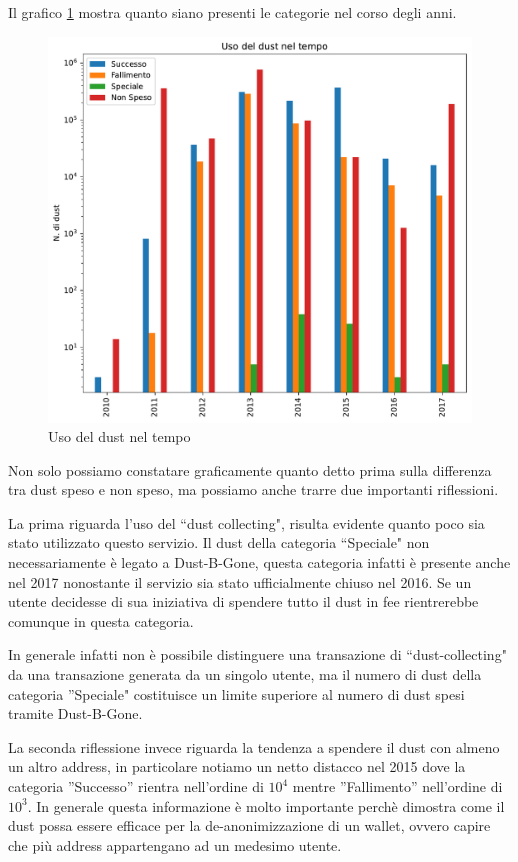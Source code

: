 Il grafico \ref{fig:dust_year} mostra quanto siano presenti le categorie nel corso degli anni.
\begin{figure}[h!]
    \centering
    \includegraphics[scale=0.6]{Grafici/uso_del_dust_new.pdf}
    \caption{Uso del dust nel tempo}
    \label{fig:dust_year}
\end{figure}
\FloatBarrier
Non solo possiamo constatare graficamente quanto detto prima sulla differenza tra dust speso e non speso, ma possiamo anche trarre due importanti riflessioni. 

La prima riguarda l'uso del ``dust collecting", risulta evidente quanto poco sia stato utilizzato questo servizio. Il dust della categoria ``Speciale" non necessariamente è legato a Dust-B-Gone, questa categoria infatti è presente anche nel 2017 nonostante il servizio sia stato ufficialmente chiuso nel 2016. Se un utente decidesse di sua iniziativa di spendere tutto il dust in fee rientrerebbe comunque in questa categoria.

In generale infatti non è possibile distinguere una transazione di ``dust-collecting" da una transazione generata da un singolo utente, ma il numero di dust della categoria ''Speciale" costituisce un limite superiore al numero di dust spesi tramite Dust-B-Gone.

La seconda riflessione invece riguarda la tendenza a spendere il dust con almeno un altro address, in particolare notiamo un netto distacco nel 2015 dove la categoria ”Successo” rientra nell’ordine di $10^4$ mentre ”Fallimento” nell’ordine di $10^3$. In generale questa informazione è molto importante perchè dimostra come il dust possa essere efficace per la de-anonimizzazione di un wallet, ovvero capire che più address appartengano ad un medesimo utente.

